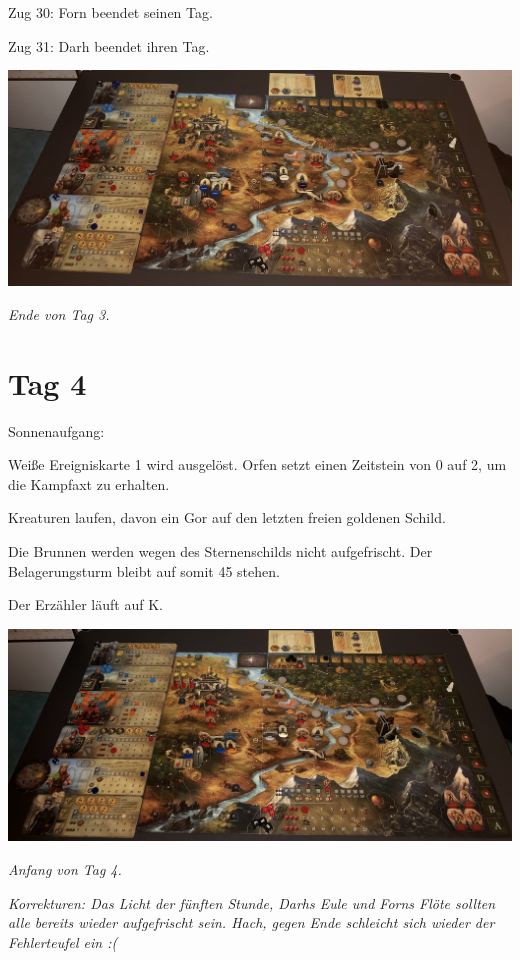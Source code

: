 \documentclass[10pt, a4paper, oneside]{book}
\begin{document}
{Zug 30: Forn beendet seinen Tag.



Zug 31: Darh beendet ihren Tag.\bigskip


\includegraphics[width=\textwidth]{Das Erbe des Wunderkindes/Bilder/Tag 3 Ende.jpg}

\textit{Ende von Tag 3.}

\newpage
\section{Tag 4}


Sonnenaufgang:

Weiße Ereigniskarte 1 wird ausgelöst. Orfen setzt einen Zeitstein von 0 auf 2, um die Kampfaxt zu erhalten.

Kreaturen laufen, davon ein Gor auf den letzten freien goldenen Schild.

Die Brunnen werden wegen des Sternenschilds nicht aufgefrischt. Der Belagerungsturm bleibt auf somit 45 stehen.

Der Erzähler läuft auf K.\bigskip

\includegraphics[width=\textwidth]{Das Erbe des Wunderkindes/Bilder/Tag 4 Anfang.jpg}

\textit{Anfang von Tag 4.}

\textit{Korrekturen: Das Licht der fünften Stunde, Darhs Eule und Forns Flöte sollten alle bereits wieder aufgefrischt sein. Hach, gegen Ende schleicht sich wieder der Fehlerteufel ein :(}\bigskip


}
\end{document}

